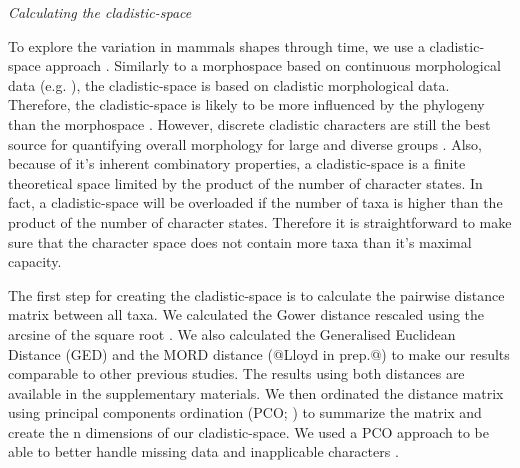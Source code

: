 \documentclass[12pt,letterpaper]{article}
\renewcommand{\subsection}[1]{%
\bigskip
\begin{center}
\begin{large}
\normalfont\itshape #1
\end{large}
\end{center}}
\begin{document}
\subsection{Calculating the cladistic-space}
To explore the variation in mammals shapes through time, we use a cladistic-space approach \cite{Foote01071994,Foote29111996,Wesley-Hunt2005,Brusatte12092008,friedmanexplosive2010,toljagictriassic-jurassic2013}. Similarly to a morphospace based on continuous morphological data (e.g. \cite{finlay2015morphological}), the cladistic-space is based on cladistic morphological data. Therefore, the cladistic-space is likely to be more influenced by the phylogeny than the morphospace \citep{Foote29111996,Wagner01011997}. However, discrete cladistic characters are still the best source for quantifying overall morphology for large and diverse groups \citep{Brusatte12092008}. Also, because of it's inherent combinatory properties, a cladistic-space is a finite theoretical space limited by the product of the number of character states. In fact, a cladistic-space will be overloaded if the number of taxa is higher than the product of the number of character states. Therefore it is straightforward to make sure that the character space does not contain more taxa than it's maximal capacity.


The first step for creating the cladistic-space is to calculate the pairwise distance matrix between all taxa. We calculated the Gower distance \citep{Gower71} rescaled using the arcsine of the square root \citep{Claddis}. We also calculated the Generalised Euclidean Distance (GED) \cite{Wills2001} and the MORD distance (@Lloyd in prep.@) to make our results comparable to other previous studies. The results using both distances are available in the supplementary materials. We then ordinated the distance matrix using principal components ordination (PCO; \citealt{GOWER01121966}) to summarize the matrix and create the n dimensions of our cladistic-space. We used a PCO approach to be able to better handle missing data and inapplicable characters \cite{lofgren2003,Wesley-Hunt2005}.
\end{document}
